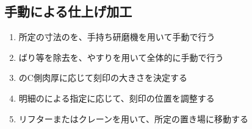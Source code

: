 \subsection{手動による仕上げ加工}
\begin{enumerate}[label=\sarrow]
\item 所定の寸法の\EndFaceChamfer を、手持ち研磨機を用いて手動で行う
\item {}ばり等を除去を、やすりを用いて全体的に手動で行う
\item {}\nameBottomEndFace のC側肉厚に応じて刻印の大きさを決定する
\item {}明細のによる指定に応じて、刻印の位置を調整する
\item {}リフターまたはクレーンを用いて、所定の置き場に移動する
\end{enumerate}


